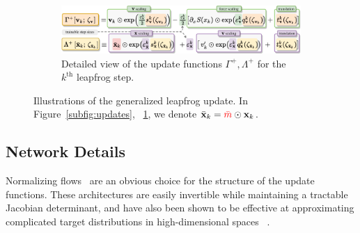 \documentclass[a4paper,11pt]{article}
\newcommand{\maskbar}{\textcolor{red}{\bar{m}}}
\begin{document}
\begin{figure}[htpb]
\begin{subfigure}[t]{\linewidth}
        \includegraphics[width=\linewidth]{assets/network_functions.pdf}
        \caption{\label{subfig:network_fns}Detailed view of the update
        functions \(\Gamma^{+}, \Lambda^{+}\) for the \(k^{\mathrm{th}}\)
    leapfrog step.}
    \end{subfigure}
    \caption{\label{fig:networks}Illustrations of the generalized
        leapfrog update. In Figure~\ref{subfig:updates},
        ~\ref{subfig:network_fns}, we denote \(\bar{\mathbf{x}}_{k} =
    \maskbar\odot \mathbf{x}_{k}\).}
\end{figure}
%
\subsection{\label{subsec:networks}Network Details}
%
Normalizing flows~\cite{2016arXiv160508803D} are an obvious choice for the
structure of the update functions.
%
These architectures are easily invertible while maintaining a tractable
Jacobian determinant, and have also been shown to be effective at approximating
complicated target distributions in high-dimensional spaces ~\cite{%
    Foreman:2021ljl,%
    Li2021ANN,%
    Foreman2018,%
    Foreman:2021ixr,%
    Kanwar:2020xzo,%
    2016arXiv160508803D,%
    Albergo:2021vyo,%
    Boyda:2020hsi,%
    2017arXiv171109268L,%
    Neklyudov2020OrbitalM,%
    neklyudovInvolutiveMcmcUnifying2020,%
    wehenkelYouSayNormalizing2020,%
    liNeuralNetworkRenormalization2018a,%
    Eichhorn:2021ccz,%
    Nicoli:2020njz%
}.
\end{document}
